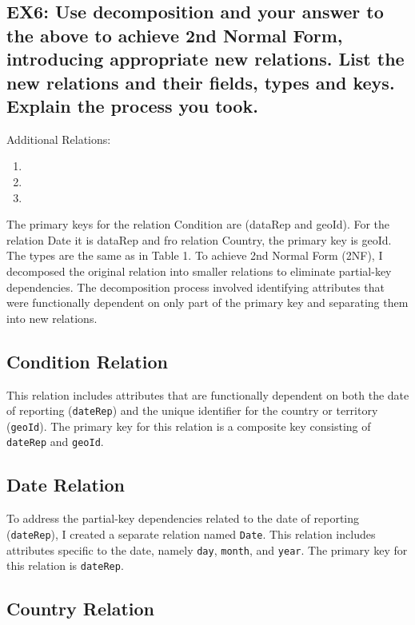 \documentclass{article}
\begin{document}
\subsection*{EX6: Use decomposition and your answer to the above to achieve 2nd Normal Form, introducing appropriate new relations. List the new relations and their fields, types and keys. Explain the process you took.}

Additional Relations:
\begin{enumerate}
    \item {}
    \item {}
    \item {}
\end{enumerate}
The primary keys for the relation Condition are (dataRep and geoId). For the relation Date it is dataRep and fro relation Country, the primary key is geoId. The types are the same as in Table 1. To achieve 2nd Normal Form (2NF), I decomposed the original relation into smaller relations to eliminate partial-key dependencies. The decomposition process involved identifying attributes that were functionally dependent on only part of the primary key and separating them into new relations.

\subsection*{\small Condition Relation}

This relation includes attributes that are functionally dependent on both the date of reporting (\texttt{dateRep}) and the unique identifier for the country or territory (\texttt{geoId}). The primary key for this relation is a composite key consisting of \texttt{dateRep} and \texttt{geoId}. 

\subsection*{\small Date Relation}

To address the partial-key dependencies related to the date of reporting (\texttt{dateRep}), I created a separate relation named \texttt{Date}. This relation includes attributes specific to the date, namely \texttt{day}, \texttt{month}, and \texttt{year}. The primary key for this relation is \texttt{dateRep}.

\subsection*{\small Country Relation}
\end{document}
